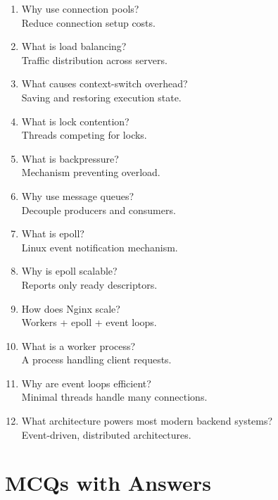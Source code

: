 \begin{enumerate}
\item Why use connection pools?\\
Reduce connection setup costs.

\item What is load balancing?\\
Traffic distribution across servers.

\item What causes context-switch overhead?\\
Saving and restoring execution state.

\item What is lock contention?\\
Threads competing for locks.

\item What is backpressure?\\
Mechanism preventing overload.

\item Why use message queues?\\
Decouple producers and consumers.

\item What is epoll?\\
Linux event notification mechanism.

\item Why is epoll scalable?\\
Reports only ready descriptors.

\item How does Nginx scale?\\
Workers + epoll + event loops.

\item What is a worker process?\\
A process handling client requests.

\item Why are event loops efficient?\\
Minimal threads handle many connections.

\item What architecture powers most modern backend systems?\\
Event-driven, distributed architectures.
\end{enumerate}

\section{MCQs with Answers}

